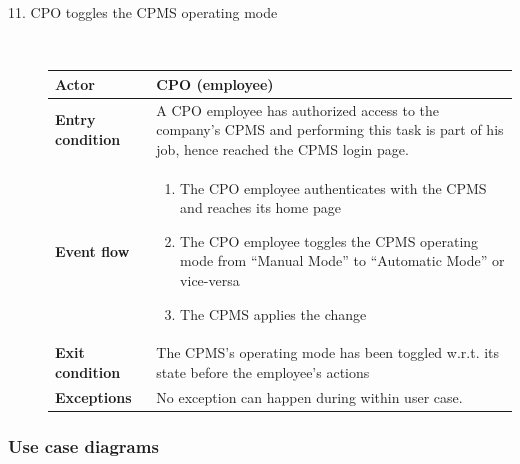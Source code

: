 \documentclass[11pt]{article}
\begin{document}
\begin{description}
    \item [11. CPO toggles the CPMS operating mode] \hfill \\
    \begin{table}[H]
        \centering
        \setlength{\tabcolsep}{18pt}
        \renewcommand{\arraystretch}{1.4}
        \begin{tabularx}{\textwidth}{|>{\hsize=0.5\hsize}X|>{\hsize=1.5\hsize}X|}
            \hline
            \textbf{Actor} & CPO (employee) \\
            \hline
            \textbf{Entry condition} & A CPO employee has authorized access to the company's CPMS and performing this task is part of his job, hence reached the CPMS login page. \\
            \hline
            \textbf{Event flow} & 
                \begin{minipage}[t]{\hsize}
                \begin{enumerate}[topsep=0pt, leftmargin=*]
                    \item The CPO employee authenticates with the CPMS and reaches its home page
                    \item The CPO employee toggles the CPMS operating mode from “Manual Mode” to “Automatic Mode” or vice-versa
                    \item The CPMS applies the change
                \end{enumerate}
                \end{minipage}
                \vspace{6pt}
            \\
            \hline
            \textbf{Exit condition} & The CPMS's operating mode has been toggled w.r.t. its state before the employee's actions \\
            \hline
            \textbf{Exceptions} & No exception can happen during within user case. \\
            \hline
        \end{tabularx}
    \end{table}
\end{description}

\subsubsection{Use case diagrams}
\end{document}
